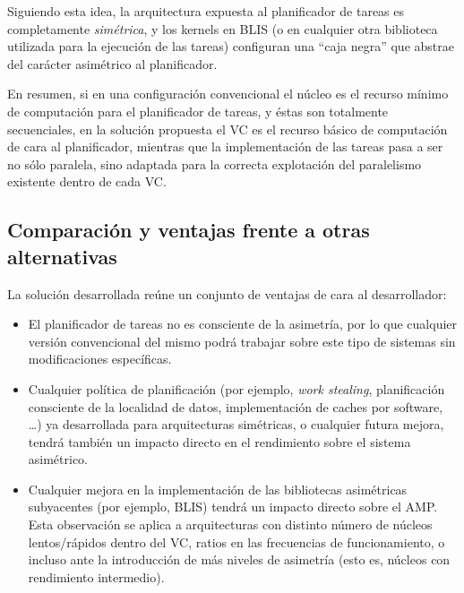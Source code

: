 Siguiendo esta idea, la arquitectura expuesta al planificador de tareas es completamente {\em simétrica}, y los kernels en BLIS
(o en cualquier otra biblioteca utilizada para la ejecución de las tareas) configuran una ``caja negra'' que abstrae del carácter
asimétrico al planificador.

En resumen, si en una configuración convencional el núcleo es el recurso mínimo de computación para el planificador de tareas,
y éstas son totalmente secuenciales, en la solución propuesta el VC es el recurso básico de computación de cara al planificador,
mientras que la implementación de las tareas pasa a ser no sólo paralela, sino adaptada para la correcta explotación del paralelismo
existente dentro de cada VC.

\subsection{Comparación y ventajas frente a otras alternativas}



La solución desarrollada reúne un conjunto de ventajas de cara al desarrollador:

\begin{itemize}
\item El planificador de tareas no es consciente de la asimetría, por lo que cualquier versión convencional 
      del mismo podrá trabajar sobre este tipo de sistemas sin modificaciones específicas. 
\item Cualquier política de planificación (por ejemplo, {\em work stealing}, planificación consciente de la localidad de datos,
      implementación de caches por software, \ldots) ya desarrollada para arquitecturas simétricas, o cualquier futura mejora,
      tendrá también un impacto directo en el rendimiento sobre el sistema asimétrico.
\item Cualquier mejora en la implementación de las bibliotecas asimétricas subyacentes (por ejemplo, BLIS) tendrá un impacto directo
      sobre el AMP. Esta observación se aplica a arquitecturas con distinto número de núcleos lentos/rápidos dentro del VC, ratios
      en las frecuencias de funcionamiento, o incluso ante la introducción de más niveles de asimetría (esto es, núcleos con rendimiento
      intermedio).
\end{itemize}

